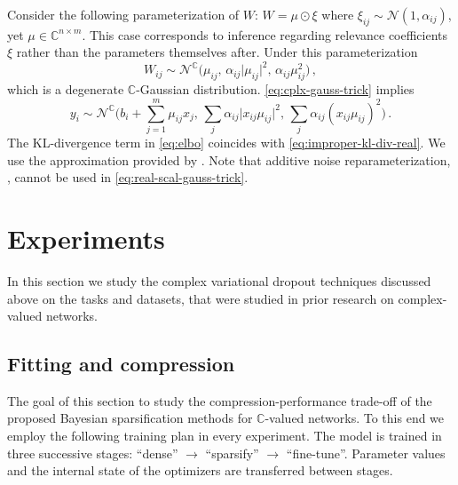 \documentclass[a4paper,10pt]{article}
\newcommand{\cplx}{\mathbb{C}}
\begin{document}
Consider the following parameterization of $W$: $
  W = \mu \odot \xi
$ where $
  \xi_{ij} \sim \mathcal{N}(1, \alpha_{ij})
$, yet $\mu \in \cplx^{n \times m}$. This case corresponds to inference regarding
relevance coefficients $\xi$ rather than the parameters themselves after. Under this
parameterization
\begin{equation}  \label{eq:real-scal-gauss-vi}
  W_{ij}
    \sim \mathcal{N}^{\cplx} \bigl(
      \mu_{ij},
      \, \alpha_{ij} \lvert \mu_{ij} \rvert^2,
      \, \alpha_{ij} \mu_{ij}^2
    \bigr)
  \,,
\end{equation}
which is a degenerate $\cplx$-Gaussian distribution. \eqref{eq:cplx-gauss-trick} implies
\begin{equation}  \label{eq:real-scal-gauss-trick}
  y_i
    \sim \mathcal{N}^{\cplx}\bigl(
      b_i + \sum_{j=1}^m \mu_{ij} x_j,
      \, \sum_j \alpha_{ij} \lvert x_{ij} \mu_{ij}\rvert^2,
      \, \sum_j \alpha_{ij} (x_{ij} \mu_{ij})^2
    \bigr)
    \,.
\end{equation}
The KL-divergence term in \eqref{eq:elbo} coincides with \eqref{eq:improper-kl-div-real}.
We use the approximation provided by \citep{molchanov_variational_2017}. Note that additive
noise reparameterization, \citep{molchanov_variational_2017}, cannot be used in
\eqref{eq:real-scal-gauss-trick}.





\section{Experiments} %
\label{sec:experiments}

In this section we study the complex variational dropout techniques discussed above
on the tasks and datasets, that were studied in prior research on complex-valued networks.

\subsection{Fitting and compression} %
\label{sub:fitting_and_compression}

The goal of this section to study the compression-performance trade-off of the proposed Bayesian
sparsification methods for $\cplx$-valued networks. To this end we employ the following training
plan in every experiment. The model is trained in three successive stages: ``dense'' $\to$
``sparsify'' $\to$ ``fine-tune''. Parameter values and the internal state of the optimizers
are transferred between stages.
\end{document}
